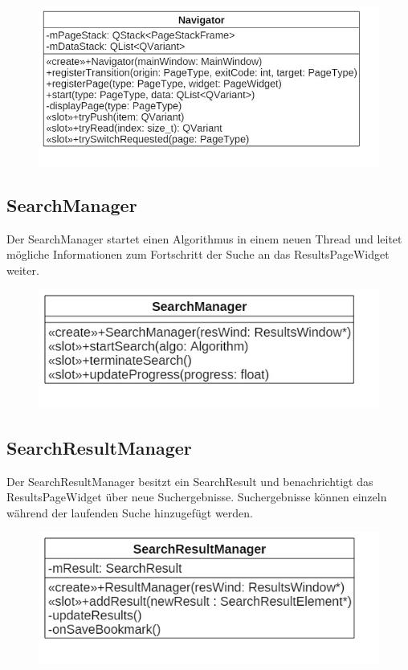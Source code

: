 \begin{figure}[H]
\centering
\includegraphics[scale=0.5]{img/Klassendiagramm/Klassen/Navigator}
\label{fig:navigator}
\end{figure}

\subsection*{SearchManager}
Der SearchManager startet einen Algorithmus in einem neuen Thread und leitet mögliche Informationen zum Fortschritt der Suche an das ResultsPageWidget weiter.

\begin{figure}[H]
\centering
\includegraphics[scale=0.5]{img/Klassendiagramm/Klassen/SearchManager}
\label{fig:searchManager}
\end{figure}

\subsection*{SearchResultManager}
Der SearchResultManager besitzt ein SearchResult und benachrichtigt das ResultsPageWidget über neue Suchergebnisse. Suchergebnisse können einzeln während der laufenden Suche hinzugefügt werden.

\begin{figure}[H]
\centering
\includegraphics[scale=0.5]{img/Klassendiagramm/Klassen/SearchResultManager}
\label{fig:searchResultManager}
\end{figure}

